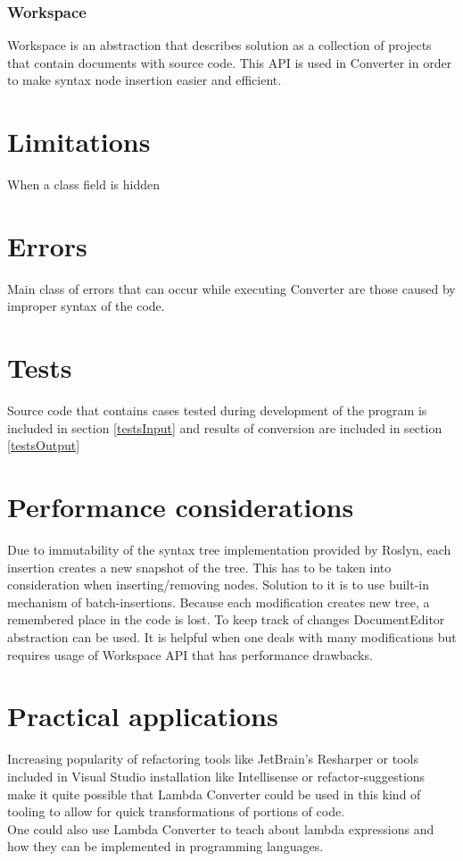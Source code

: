 \documentclass[]{report}
\begin{document}
    \subsubsection{Workspace}
    Workspace is an abstraction that describes solution as a collection of projects that contain documents with source code. This API is used in Converter in order to make syntax node insertion easier and efficient.
    
    \section{Limitations}
    When a class field is hidden 
    \section{Errors}
    Main class of errors that can occur while executing Converter are those caused by improper syntax of the code.  
    
    \section{Tests}
     Source code that contains cases tested during development of the program is included in section \ref{testsInput} and results of conversion are included in section \ref{testsOutput}
    
    
    \section{Performance considerations}
    Due to immutability of the syntax tree implementation provided by Roslyn, each insertion creates a new snapshot of the tree. This has to be taken into consideration when inserting/removing nodes. Solution to it is to use built-in mechanism of batch-insertions. Because each modification creates new tree, a remembered place in the code is lost. To keep track of changes DocumentEditor abstraction can be used. It is helpful when one deals with many modifications but requires usage of Workspace API that has performance drawbacks.
    
    \section{Practical applications}
    Increasing popularity of refactoring tools like JetBrain's Resharper or tools included in Visual Studio installation like Intellisense or refactor-suggestions make it quite possible that Lambda Converter could be used in this kind of tooling to allow for quick transformations of portions of code.
    \\
    One could also use Lambda Converter to teach about lambda expressions and how they can be implemented in programming languages. 
\end{document}
